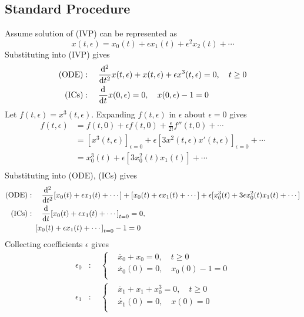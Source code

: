 \documentclass[12pt,twoside]{article}
\begin{document}
\subsection{Standard Procedure}
Assume solution of (IVP) can be represented as
$$x(t,\epsilon)=x_0(t)+\epsilon x_1(t)+\epsilon^2 x_2(t)+\cdots$$
Substituting into (IVP) gives
\begin{align*}
  \text{(ODE)} &:\quad \od[2]{}{t}x(t,\epsilon) + x(t,\epsilon) + \epsilon
               x^3(t,\epsilon) = 0,\quad t\ge 0 \\
  \text{(ICs)} &:\quad \od{}{t}x(0,\epsilon)=0,\quad x(0,\epsilon)-1=0 \\
\end{align*}
Let $f(t,\epsilon)=x^3(t,\epsilon)$. Expanding $f(t,\epsilon)$ in $\epsilon$
about $\epsilon=0$ gives
\begin{align*}
  f(t,\epsilon)
  &= f(t,0) + \epsilon f(t,0) + \frac{\epsilon}{2!}f''(t,0) + \cdots \\
  &= {[x^3(t,\epsilon)]}_{\epsilon=0} + \epsilon {[3x^2(t,\epsilon)x'(t,\epsilon)]}_{\epsilon=0} + \cdots \\
  &= x^3_0(t) + \epsilon[3x_0^2(t)x_1(t)] + \cdots \\
\end{align*}
Substituting into (ODE), (ICs) gives
\begin{align*}
  \text{(ODE)} &:\quad \od[2]{}{t}[x_0(t)+\epsilon x_1(t)+\cdots] +
               [x_0(t)+\epsilon x_1(t)+\cdots] + \epsilon[x_0^3(t)+3\epsilon
               x_0^2(t)x_1(t)+\cdots] \\
  \text{(ICs)} &:\quad \od{}{t}{[x_0(t)+\epsilon x_1(t)+\cdots]}_{t=0}=0, \\
             &\quad {[x_0(t)+\epsilon x_1(t)+\cdots]}_{t=0}-1=0 \\
\end{align*}
Collecting coefficients $\epsilon$ gives
\begin{equation}
  \begin{aligned}
    \epsilon_0 &:\quad \left\{
      \begin{aligned}
        &\ddot{x_0} + x_0 = 0,\quad t\ge0 \\
        &\dot{x_0}(0) =0, \quad x_0(0)-1=0 \\
      \end{aligned}\right. \\
     \epsilon_1 &:\quad \left\{
      \begin{aligned}
        &\ddot{x_1}+x_1 + x_0^3 =0,\quad t\ge0 \\
        &\dot{x_1}(0)=0,\quad x(0)=0 \\
      \end{aligned} \right.
  \end{aligned}
\end{equation}
\end{document}
